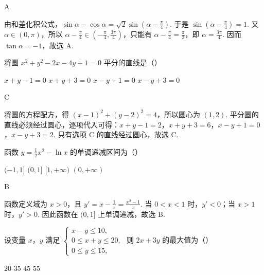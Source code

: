 \begin{answer}
A
\end{answer}

\begin{solution}
由和差化积公式，\(\sin\alpha-\cos\alpha=\sqrt{2}\sin\left(\alpha-\frac{\pi}{4}\right)\). 于是 \(\sin\left(\alpha-\frac{\pi}{4}\right)=1\). 又 \(\alpha\in(0,\pi)\)，所以 \(\alpha-\frac{\pi}{4}\in\left(-\frac{\pi}{4},\frac{3\pi}{4}\right)\)，只能有 \(\alpha-\frac{\pi}{4}=\frac{\pi}{2}\)，即 \(\alpha=\frac{3\pi}{4}\). 因而 \(\tan\alpha=-1\)，故选 A.
\end{solution}

\begin{problem}
将圆 \(x^{2} + y^{2} - 2x - 4y + 1 = 0\) 平分的直线是（\quad）

\choices
    {\(x + y - 1 = 0\)}
    {\(x + y + 3 = 0\)}
    {\(x - y + 1 = 0\)}
    {\(x - y + 3 = 0\)}
\end{problem}

\begin{answer}
C
\end{answer}

\begin{solution}
将圆的方程配方，得 \(\left(x-1\right)^2+\left(y-2\right)^2=4\)，所以圆心为 \(\left(1,2\right)\). 平分圆的直线必须经过圆心，逐项代入可得：\(x+y-1=2\)，\(x+y+3=6\)，\(x-y+1=0\)，\(x-y+3=2\). 只有选项 C 的直线经过圆心，故选 C.
\end{solution}

\begin{problem}
函数 \( y = \frac{1}{2} x^2 - \ln x \) 的单调递减区间为（\quad）

\choices
    {\((-1, 1]\)}
    {\((0,1]\)}
    {\([1, +\infty)\)}
    {\((0, +\infty)\)}
\end{problem}

\begin{answer}
B
\end{answer}

\begin{solution}
函数定义域为 \(x>0\)，且 \(\displaystyle y'=x-\frac{1}{x}=\frac{x^2-1}{x}\). 当 \(0<x<1\) 时，\(y'<0\)；当 \(x>1\) 时，\(y'>0\). 因此函数在 \((0,1]\) 上单调递减，故选 B.
\end{solution}

\begin{problem}
设变量 \(x\)，\(y\) 满足 \(\begin{cases}
x - y \leqslant 10,\\
0 \leqslant x + y \leqslant 20,\\
0 \leqslant y \leqslant 15,
\end{cases}\) 则 \(2x + 3y\) 的最大值为（\quad）

\choices
    {\(20\)}
    {\(35\)}
    {\(45\)}
    {\(55\)}
\end{problem}

